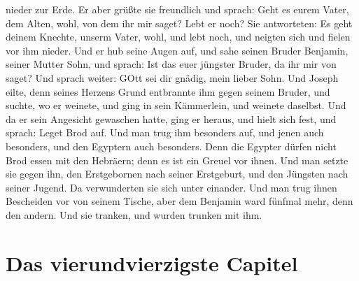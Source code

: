 \begin{schriftzitat}
nieder zur Erde. Er aber grüßte sie freundlich und sprach: Geht es eurem Vater, dem Alten, wohl, von dem ihr mir saget? Lebt er noch? Sie antworteten: Es geht deinem Knechte, unserm Vater, wohl, und lebt noch, und neigten sich und fielen vor ihm nieder. Und er hub seine Augen auf, und sahe seinen Bruder Benjamin, seiner Mutter Sohn, und sprach: Ist das euer jüngster Bruder, da ihr mir von saget? Und sprach weiter: GOtt sei dir gnädig, mein lieber Sohn. Und Joseph eilte, denn seines Herzens Grund entbrannte ihm gegen seinem Bruder, und suchte, wo er weinete, und ging in sein Kämmerlein, und weinete daselbst. Und da er sein Angesicht gewaschen hatte, ging er heraus, und hielt sich fest, und sprach: Leget Brod auf. Und man trug ihm besonders auf, und jenen auch besonders, und den Egyptern auch besonders. Denn die Egypter dürfen nicht Brod essen mit den Hebräern; denn es ist ein Greuel vor ihnen. Und man setzte sie gegen ihn, den Erstgebornen nach seiner Erstgeburt, und den Jüngsten nach seiner Jugend. Da verwunderten sie sich unter einander. Und man trug ihnen Bescheiden vor von seinem Tische, aber dem Benjamin ward fünfmal mehr, denn den andern. Und sie tranken, und wurden trunken mit ihm.
\end{schriftzitat}

\section{Das vierundvierzigste Capitel}

